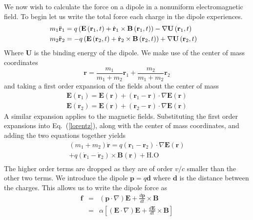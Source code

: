 We now wish to calculate the force on a dipole in a nonuniform electromagnetic field.  To begin let us write the total force each charge in the dipole experiences.
\begin{eqnarray}
&m_1\ddot{\bf{r}}_1=q\left(\mathbf{E}\left(\mathbf{r}_1,t\right)+\dot{\mathbf{r}}_1\times\mathbf{B}\left(\mathbf{r}_1,t\right)\right)-\nabla\mathbf{U}\left(\mathbf{r}_1,t\right)&\nonumber \\
&m_2\ddot{\bf{r}}_2=-q\left(\mathbf{E}\left(\mathbf{r}_2,t\right)+\dot{\mathbf{r}}_2\times\mathbf{B}\left(\mathbf{r}_2,t\right)\right)+\nabla\mathbf{U}\left(\mathbf{r}_2,t\right)&  
\label{lorentz}
\end{eqnarray}
Where $\mathbf{U}$ is the binding energy of the dipole. We make use of the center of mass coordinates
\begin{equation}
\mathbf{r}=\frac{m_1}{m_1+m_2}\mathbf{r}_1+\frac{m_2}{m_1+m_2}\mathbf{r}_2
\label{com}
\end{equation}
and taking a first order expansion of the fields about the center of mass
\begin{eqnarray}
&\mathbf{E}\left(\mathbf{r}_1\right)=\mathbf{E}\left(\mathbf{r}\right)+\left(\mathbf{r}_1-\mathbf{r}\right)\cdot\nabla\mathbf{E}\left(\mathbf{r}\right)& \nonumber \\
&\mathbf{E}\left(\mathbf{r}_2\right)=\mathbf{E}\left(\mathbf{r}\right)+\left(\mathbf{r}_2-\mathbf{r}\right)\cdot\nabla\mathbf{E}\left(\mathbf{r}\right)&
\label{expansion}
\end{eqnarray}
A similar expansion applies to the magnetic fields. Substituting the first order expansions into Eq.\ (\ref{lorentz}), along with the center of mass coordinates, and adding the two equations together yields
\begin{eqnarray}
&\left(m_1+m_2\right)\ddot{\mathbf{r}}=q\left(\mathbf{r}_1-\mathbf{r}_2\right)\cdot\nabla\mathbf{E}\left(\mathbf{r}\right) &\nonumber \\
&+q\left(\dot{\mathbf{r}}_1-\dot{\mathbf{r}}_2\right)\times\mathbf{B}\left(\mathbf{r}\right)+ \mathrm{H.O}&\nonumber\\
\end{eqnarray}
The higher order terms are dropped as they are of order $v/c$ smaller than the other two terms. We introduce the dipole $\mathbf{p}=q\mathbf{d}$ where $\mathbf{d}$ is the distance between the charges.  This allows us to write the dipole force as
\begin{eqnarray}
 \mathbf{f} &=& \left(\mathbf{p}\cdot\nabla\right)\mathbf{E}+\frac{d\mathbf{p}}{dt}\times\mathbf{B} \nonumber \\
 &=& \alpha\left[\left(\mathbf{E}\cdot\nabla\right)\mathbf{E}+\frac{d\mathbf{E}}{dt}\times\mathbf{B}\right] 
\label{lorentz3}
\end{eqnarray}


